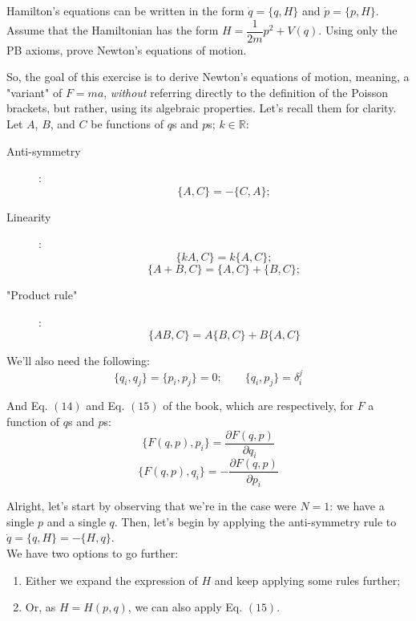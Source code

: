 \documentclass[solutions.tex]{subfiles}
\begin{document}
\maketitle
\begin{exercise}
Hamilton's equations can be written in the form $\dot{q} = \{q, H\}$
and $\dot{p} = \{p, H\}$. Assume that the Hamiltonian has the form
$H = \dfrac1{2m}p^2+V(q)$. Using only the PB axioms, prove Newton's
equations of motion.
\end{exercise}
So, the goal of this exercise is to derive Newton's equations of
motion, meaning, a "variant" of $F = ma$, \textit{without} referring
directly to the definition of the Poisson brackets, but rather, using
its algebraic properties. Let's recall them for clarity. \\

Let $A$, $B$, and $C$ be functions of $q$s and $p$s; $k\in\mathbb{R}$:

\begin{description}
	\item[Anti-symmetry]: \[ \{A, C\} = -\{C, A \}; \]
	\item[Linearity]:
		\[ \{k A, C\} = k \{A, C\}; \]
		\[ \{A + B, C\} = \{A, C\} + \{B, C\}; \]
	\item["Product rule"]:
		\[ \{AB, C\} = A\{B, C\} + B\{A, C\} \]
\end{description}

We'll also need the following:
\[
	\{ q_i, q_j \} = \{ p_i, p_j \} = 0; \qquad \{ q_i, p_j \} = \delta_i^j
\]

And Eq. $(14)$ and Eq. $(15)$ of the book, which are respectively,
for $F$ a function of $q$s and $p$s:
\[
	\{ F(q, p), p_i \} = \frac{\partial F(q, p)}{\partial q_i}
\]
\[
	\{ F(q, p), q_i \} = -\frac{\partial F(q, p)}{\partial p_i}
\]

\hr

Alright, let's start by observing that we're in the case were $N=1$:
we have a single $p$ and a single $q$. Then, let's begin by applying
the anti-symmetry rule to $\dot{q} = \{q, H\} = - \{H, q\}$. \\

We have two options to go further:
\begin{enumerate}
	\item Either we expand the expression of $H$ and keep applying
	some rules further;
	\item Or, as $H = H(p,q)$, we can also apply Eq. $(15)$.
\end{enumerate}
\end{document}
